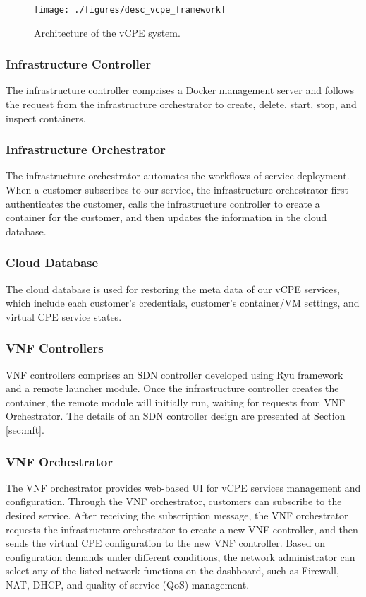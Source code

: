 \documentclass[conference]{IEEEtran}
\begin{document}
\begin{figure}[!t]
\centering
\texttt{[image: ./figures/desc\_vcpe\_framework]}
\caption{Architecture of the vCPE system.}
\label{fig:desc_vcpe_framework}
\end{figure}

\subsubsection{Infrastructure Controller}

The infrastructure controller comprises a Docker management server and follows the request from the infrastructure orchestrator to create, delete, start, stop, and inspect containers.

\subsubsection{Infrastructure Orchestrator}

The infrastructure orchestrator automates the workflows of service deployment. When a customer subscribes to our service, the infrastructure orchestrator first authenticates the customer, calls the infrastructure controller to create a container for the customer, and then updates the information in the cloud database.

\subsubsection{Cloud Database}
The cloud database is used for restoring the meta data of our vCPE services, which include each customer’s credentials, customer's container/VM settings, and virtual CPE service states.

\subsubsection{VNF Controllers}
VNF controllers comprises an SDN controller developed using Ryu framework \cite{ryu} and a remote launcher module. Once the infrastructure controller creates the container, the remote module will initially run, waiting for requests from VNF Orchestrator. The details of an SDN controller design are presented at Section \ref{sec:mft}.

\subsubsection{VNF Orchestrator}
The VNF orchestrator provides web-based UI for vCPE services management and configuration. Through the VNF orchestrator, customers can subscribe to the desired service. After receiving the subscription message, the VNF orchestrator requests the infrastructure orchestrator to create a new VNF controller, and then sends the virtual CPE configuration to the new VNF controller. Based on configuration demands under different conditions, the network administrator can select any of the listed network functions on the dashboard, such as Firewall, NAT, DHCP, and quality of service (QoS) management.
\end{document}
